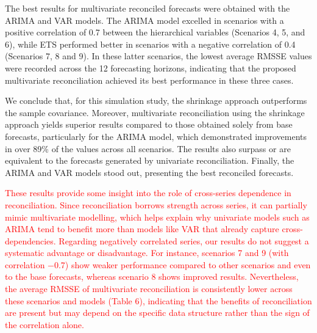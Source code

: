 \documentclass[a4paper,preprint,11pt,authoryear]{elsarticle}
\begin{document}
The best results for multivariate reconciled forecasts were obtained with the ARIMA and VAR models. The ARIMA model excelled in scenarios with a positive correlation of 0.7 between the hierarchical variables (Scenarios 4, 5, and 6), while ETS performed better in scenarios with a negative correlation of 0.4 (Scenarios 7, 8 and 9). In these latter scenarios, the lowest average RMSSE values were recorded across the 12 forecasting horizons, indicating that the proposed multivariate reconciliation achieved its best performance in these three cases.



We conclude that, for this simulation study, the shrinkage approach outperforms the sample covariance. Moreover, multivariate reconciliation using the shrinkage approach yields superior results compared to those obtained solely from base forecasts, particularly for the ARIMA model, which demonstrated improvements in over 89\% of the values across all scenarios. The results also surpass or are equivalent to the forecasts generated by univariate reconciliation. Finally, the ARIMA and VAR models stood out, presenting the best reconciled forecasts.


\textcolor{red}{These results provide some insight into the role of cross-series dependence in reconciliation. Since reconciliation borrows strength across series, it can partially mimic multivariate modelling, which helps explain why univariate models such as ARIMA tend to benefit more than models like VAR that already capture cross-dependencies. Regarding negatively correlated series, our results do not suggest a systematic advantage or disadvantage. For instance, scenarios 7 and 9 (with correlation −0.7) show weaker performance compared to other scenarios and even to the base forecasts, whereas scenario 8 shows improved results. Nevertheless, the average RMSSE of multivariate reconciliation is consistently lower across these scenarios and models (Table 6), indicating that the benefits of reconciliation are present but may depend on the specific data structure rather than the sign of the correlation alone.}
\end{document}
